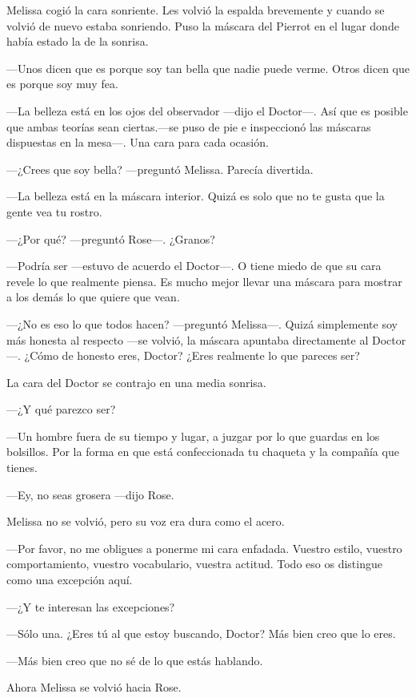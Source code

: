 {Melissa cogió la cara sonriente. Les volvió la espalda brevemente y
	cuando se volvió de nuevo estaba sonriendo. Puso la máscara del Pierrot
en el lugar donde había estado la de la sonrisa.}

{---Unos dicen que es porque soy tan bella que nadie puede verme. Otros
dicen que es porque soy muy fea.}

{---La belleza está en los ojos del observador ---dijo el Doctor---. Así
	que es posible que ambas teorías sean ciertas.---se puso de pie e
	inspeccionó las máscaras dispuestas en la mesa---. Una cara para cada
ocasión.}

{---¿Crees que soy bella? ---preguntó Melissa. Parecía divertida.}

{---La belleza está en la máscara interior. Quizá es solo que no te
gusta que la gente vea tu rostro.}

{---¿Por qué? ---preguntó Rose---. ¿Granos?}

{---Podría ser ---estuvo de acuerdo el Doctor---. O tiene miedo de que
	su cara revele lo que realmente piensa. Es mucho mejor llevar una
máscara para mostrar a los demás lo que quiere que vean.}

{---¿No es eso lo que todos hacen? ---preguntó Melissa---. Quizá
	simplemente soy más honesta al respecto ---se volvió, la máscara
	apuntaba directamente al Doctor---. ¿Cómo de honesto eres, Doctor?
¿Eres realmente lo que pareces ser?}

{La cara del Doctor se contrajo en una media sonrisa.}

{---¿Y qué parezco ser?}

{---Un hombre fuera de su tiempo y lugar, a juzgar por lo que guardas en
	los bolsillos. Por la forma en que está confeccionada tu chaqueta y la
compañía que tienes.}

{---Ey, no seas grosera ---dijo Rose.}

{Melissa no se volvió, pero su voz era dura como el acero.}

{---Por favor, no me obligues a ponerme mi cara enfadada. Vuestro
	estilo, vuestro comportamiento, vuestro vocabulario, vuestra actitud.
Todo eso os distingue como una excepción aquí.}

{---¿Y te interesan las excepciones?}

{---Sólo una. ¿Eres tú al que estoy buscando, Doctor? Más bien creo que
lo eres.}

{---Más bien creo que no sé de lo que estás hablando.}

{Ahora Melissa se volvió hacia Rose.}

